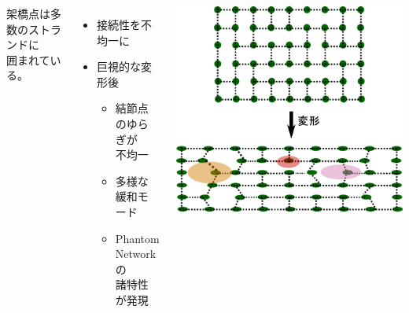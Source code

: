 \documentclass[12pt, dvipdfmx]{beamer}
\begin{document}
\begin{frame}
\begin{columns}[totalwidth=\textwidth]
			\small
			架橋点は\alert{多数のストランド}に\\囲まれている。
			\begin{itemize}
				\item 接続性を不均一に
				\item 巨視的な変形後
					\begin{itemize}
						\normalsize
						\item \alert{結節点のゆらぎが\\不均一}
						\item 多様な緩和モード
					\item \alert{Phantom Network の\\諸特性が発現}
					\end{itemize}
			\end{itemize}
			\centering
			\includegraphics[width=\textwidth]{random_NW.png}
	\end{columns}
\end{frame}
\end{document}
